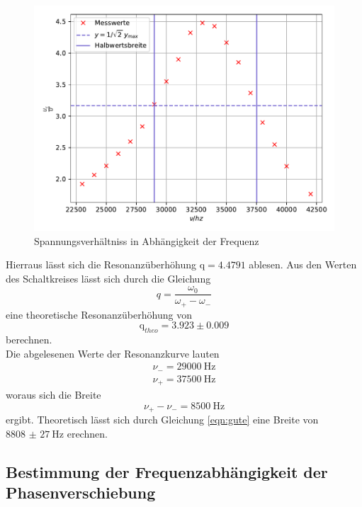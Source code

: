 \begin{figure}[H]
  \centering
  \includegraphics{plot3.pdf}
  \caption{Spannungsverhältniss in Abhängigkeit der Frequenz}
  \label{fig:plot3}
\end{figure}

\noindent Hierraus lässt sich die Resonanzüberhöhung $\text{q} = 4.4791 $ ablesen. Aus den Werten des
Schaltkreises lässt sich durch die Gleichung
\begin{equation}
  q= \frac{\omega_0}{\omega_+-\omega_-}
\end{equation}
eine theoretische Resonanzüberhöhung von
\begin{equation*}
  \text{q}_{theo} = 3.923 \pm 0.009
\end{equation*}
\noindent berechnen. \\
\noindent Die abgelesenen Werte der Resonanzkurve lauten
\begin{align*}
  \nu_- =\SI{29000}{\hertz} \\ %
  \nu_+ =\SI{37500}{\hertz} %
\end{align*}
woraus sich die Breite
\begin{equation*}
  \nu_+ - \nu_- = \SI{8500}{\hertz}
\end{equation*}
ergibt. Theoretisch lässt sich durch Gleichung \ref{eqn:gute}
eine Breite von $\SI{8808(27)}{\hertz} $ erechnen.
\subsection{Bestimmung der Frequenzabhängigkeit der Phasenverschiebung}

